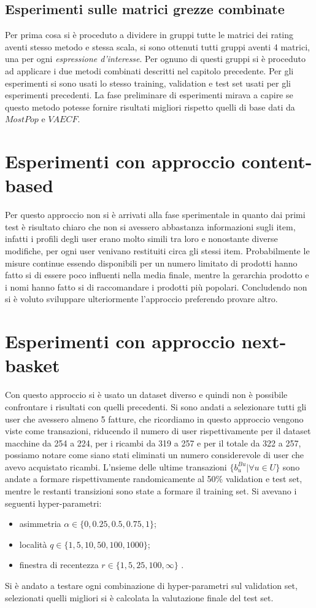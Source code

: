 \subsection{Esperimenti sulle matrici grezze combinate}
Per prima cosa si è proceduto a dividere in gruppi tutte le matrici dei rating aventi stesso metodo e stessa scala, si sono ottenuti tutti gruppi aventi 4 matrici, una per ogni \textit{espressione d'interesse}. Per ognuno di questi gruppi si è proceduto ad applicare i due metodi combinati descritti nel capitolo precedente. Per gli esperimenti si sono usati lo stesso training, validation e test set usati per gli esperimenti precedenti. La fase preliminare di esperimenti mirava a capire se questo metodo potesse fornire risultati migliori rispetto quelli di base dati da $MostPop$ e $VAECF$.

\section{Esperimenti con approccio content-based}
Per questo approccio non si è arrivati alla fase sperimentale in quanto dai primi test è risultato chiaro che non si avessero abbastanza informazioni sugli item, infatti i profili degli user erano molto simili tra loro e nonostante diverse modifiche, per ogni user venivano restituiti circa gli stessi item. Probabilmente le misure continue essendo disponibili per un numero limitato di prodotti hanno fatto si di essere poco influenti nella media finale, mentre la gerarchia prodotto e i nomi hanno fatto si di raccomandare i prodotti più popolari. Concludendo non si è voluto sviluppare ulteriormente l'approccio preferendo provare altro.

\section{Esperimenti con approccio next-basket}
Con questo approccio si è usato un dataset diverso e quindi non è possibile confrontare i risultati con quelli precedenti. Si sono andati a selezionare tutti gli user che avessero almeno 5 fatture, che ricordiamo in questo approccio vengono viste come transazioni, riducendo il numero di user rispettivamente per il dataset macchine da 254 a 224, per i ricambi da 319 a 257 e per il totale da 322 a 257, possiamo notare come siano stati eliminati un numero considerevole di user che avevo acquistato ricambi. L'nsieme delle ultime transazioni $\{b_{u}^{Bu}| \forall u \in U\}$ sono andate a formare rispettivamente randomicamente al 50\% validation e test set, mentre le restanti transizioni sono state a formare il training set. 
\newpage
Si avevano i seguenti hyper-parametri:
\begin{itemize}
    \item asimmetria $\alpha \in \{0, 0.25, 0.5, 0.75, 1\}$;
    \item località $q \in \{1, 5, 10, 50, 100, 1000\}$;
    \item finestra di recentezza $r \in \{1, 5, 25, 100, \infty \}$ .
\end{itemize}

Si è andato a testare ogni combinazione di hyper-parametri sul validation set, selezionati quelli migliori si è calcolata la valutazione finale del test set.